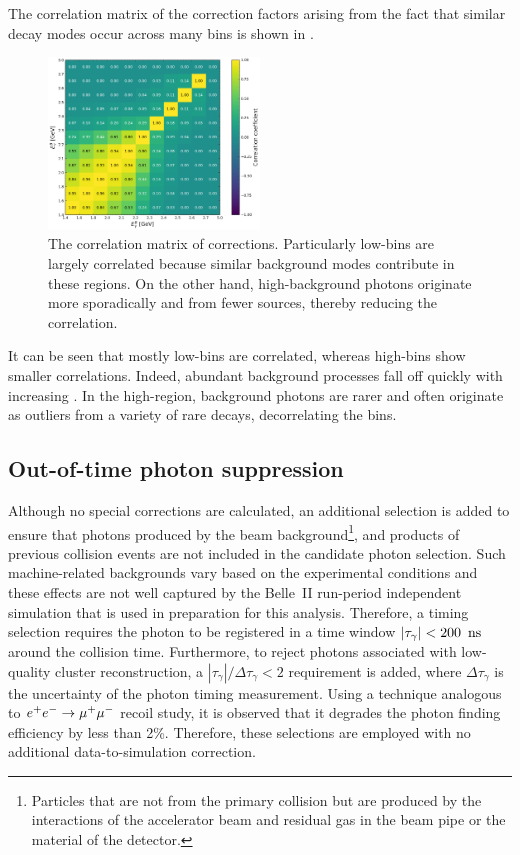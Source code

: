 The correlation matrix of the correction factors arising from the fact that similar decay modes occur across many bins is shown in .
\begin{figure}[hbtp!]
    \centering
    \includegraphics[width=0.5\textwidth]{figures/data_sim_corrections/bbar_correlation_matrix.pdf}
    \caption{\label{fig:bbar_correlation_matrix} The correlation matrix of \BB corrections.
    Particularly low-\EB bins are largely correlated because similar background modes contribute in these regions.
    On the other hand, high-\EB background photons originate more sporadically and from fewer sources, thereby reducing the correlation.
    }
\end{figure}
It can be seen that mostly low-\EB bins are correlated, whereas high-\EB bins show smaller correlations.
Indeed, abundant background processes fall off quickly with increasing \EB.
In the high-\EB region, background photons are rarer and often originate as outliers from a variety of rare decays, decorrelating the bins.

\subsection{Out-of-time photon suppression}\label{sec:out_of_time_photon_suppression}

Although no special corrections are calculated, an additional selection is added to ensure that photons produced by the beam background\footnote{
Particles that are not from the primary collision but are produced by the interactions of the accelerator beam 
and residual gas in the beam pipe or the material of the detector.},
and products of previous collision events are not included in the candidate photon selection.
Such machine-related backgrounds vary based on the experimental conditions and these effects are not well captured by the Belle~II run-period independent simulation that is used in preparation for this analysis.
Therefore, a timing selection requires the photon to be registered in a time window $|\tau_{\gamma}|<200~{\rm \,ns}$ around the collision time.
Furthermore, to reject photons associated with low-quality cluster reconstruction, a $|\tau_{\gamma}|/\Delta\tau_{\gamma}<2$ requirement is added, 
where $\Delta\tau_{\gamma}$ is the uncertainty of the photon timing measurement.
Using a technique analogous to $e^+e^-\rightarrow\mu^+\mu^-$ recoil study, it is observed that it degrades the photon finding efficiency by less than 2\%.
Therefore, these selections are employed with no additional data-to-simulation correction.